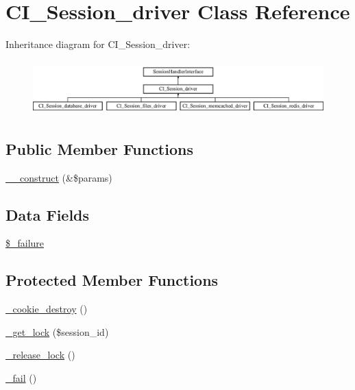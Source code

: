 \hypertarget{class_c_i___session__driver}{}\section{C\+I\+\_\+\+Session\+\_\+driver Class Reference}
\label{class_c_i___session__driver}
Inheritance diagram for C\+I\+\_\+\+Session\+\_\+driver\+:\begin{figure}[H]
\begin{center}
\leavevmode
\includegraphics[height=2.121212cm]{class_c_i___session__driver}
\end{center}
\end{figure}
\subsection*{Public Member Functions}
\begin{DoxyCompactItemize}
\item 
\mbox{\hyperlink{class_c_i___session__driver_ac1669c73d53d6f16cf5459a1e84d39c8}{\+\_\+\+\_\+construct}} (\&\$params)
\end{DoxyCompactItemize}
\subsection*{Data Fields}
\begin{DoxyCompactItemize}
\item 
\mbox{\hyperlink{class_c_i___session__driver_af597a603db9347ef534b97834ed272a8}{\$\+\_\+failure}}
\end{DoxyCompactItemize}
\subsection*{Protected Member Functions}
\begin{DoxyCompactItemize}
\item 
\mbox{\hyperlink{class_c_i___session__driver_a36771b622e8a8928c1c931ac56c12434}{\+\_\+cookie\+\_\+destroy}} ()
\item 
\mbox{\hyperlink{class_c_i___session__driver_a2c49c8e23be3e2aca96a9d20de18ffc2}{\+\_\+get\+\_\+lock}} (\$session\+\_\+id)
\item 
\mbox{\hyperlink{class_c_i___session__driver_a0265e356e6cf1eaba229663c1664c37d}{\+\_\+release\+\_\+lock}} ()
\item 
\mbox{\hyperlink{class_c_i___session__driver_a1b1bf5bb9cba50e84f985c30f6b64773}{\+\_\+fail}} ()
\end{DoxyCompactItemize}
